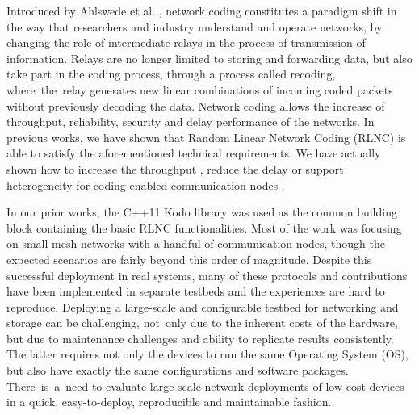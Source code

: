 \documentclass[electronics,article,accept,moreauthors,pdftex,10pt,a4paper]{mdpi}
\theoremstyle{mdpi}
\newcounter{ex}
\newcounter{re}
\theoremstyle{mdpidefinition}
\begin{document}
Introduced by Ahlswede et al. \cite{ahlswede2000network}, network coding constitutes a paradigm shift in the way that researchers and industry understand and operate networks, by changing the role of intermediate relays in the process of transmission of information. Relays are no longer limited to storing and forwarding data, but also take part in the coding process, through a process called recoding, \mbox{where the relay} generates new linear combinations of incoming coded packets without previously decoding the data. Network coding allows the increase of throughput, reliability, security and delay performance of the networks. In previous works, we have shown that Random Linear Network Coding (RLNC)
\cite{koetter2003algebraic,ho2006random} is able to satisfy the aforementioned technical requirements. We have actually shown how to increase the throughput \cite{pahlevani2013playncool}, reduce the delay \cite{szabo2015towards} or support heterogeneity for coding enabled communication nodes \cite{lucani2014fulcrum}.

In our prior works, the C++11 Kodo library \cite{kodo2011pedersen} was used as the common building block containing the basic RLNC functionalities. Most of the work was focusing on small mesh networks with a handful of communication nodes, though the expected scenarios are fairly beyond this order of magnitude. Despite this successful deployment in real systems, many of these protocols and contributions have been implemented in separate testbeds and the experiences are hard to reproduce. Deploying a large-scale and configurable testbed for networking and storage can be challenging, not~only due to the inherent costs of the hardware, but due to maintenance challenges and ability to replicate results consistently. The latter requires not only the devices to run the same Operating System (OS), but also have exactly the same configurations and software packages. \mbox{There is a need} to evaluate large-scale network deployments of low-cost devices in a quick, easy-to-deploy, reproducible and maintainable fashion.
\end{document}
